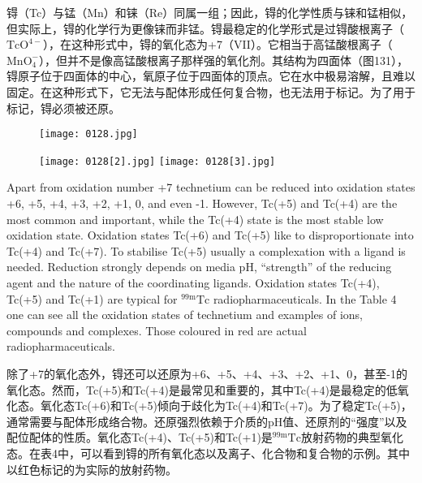 \documentclass[dvipsnames, svgnames,a4paper,11pt]{article}
\begin{document}
锝（Tc）与锰（Mn）和铼（Re）同属一组；因此，锝的化学性质与铼和锰相似，但实际上，锝的化学行为更像铼而非锰。锝最稳定的化学形式是过锝酸根离子（$\mathrm{TcO^{4-}}$），在这种形式中，锝的氧化态为+7（VII）。它相当于高锰酸根离子（$\mathrm{MnO_4^-}$），但并不是像高锰酸根离子那样强的氧化剂。其结构为四面体（图131），锝原子位于四面体的中心，氧原子位于四面体的顶点。它在水中极易溶解，且难以固定。在这种形式下，它无法与配体形成任何复合物，也无法用于标记。为了用于标记，锝必须被还原。

\begin{figure}[h]
	\centering
    \texttt{[image: 0128.jpg]}    
     \label{fig130}
\end{figure}

\begin{figure}[h]
	\centering
    \texttt{[image: 0128[2].jpg]}    
    \hspace{0.2in}
    \texttt{[image: 0128[3].jpg]} 
     \label{fig131}
\end{figure}

Apart from oxidation number +7 technetium can be reduced into oxidation states +6,
+5, +4, +3, +2, +1, 0, and even -1. However, Tc(+5) and Tc(+4) are the most
common and important, while the Tc(+4) state is the most stable low oxidation state.
Oxidation states Tc(+6) and Tc(+5) like to disproportionate into Tc(+4) and Tc(+7).
To stabilise Tc(+5) usually a complexation with a ligand is needed. Reduction
strongly depends on media pH, “strength” of the reducing agent and the nature of the
coordinating ligands. Oxidation states Tc(+4), Tc(+5) and Tc(+1) are typical for ${}^\mathrm{99m}\mathrm{Tc}$
radiopharmaceuticals. In the Table 4 one can see all the oxidation states of
technetium and examples of ions, compounds and complexes. Those coloured in red
are actual radiopharmaceuticals.

除了+7的氧化态外，锝还可以还原为+6、+5、+4、+3、+2、+1、0，甚至-1的氧化态。然而，Tc(+5)和Tc(+4)是最常见和重要的，其中Tc(+4)是最稳定的低氧化态。氧化态Tc(+6)和Tc(+5)倾向于歧化为Tc(+4)和Tc(+7)。为了稳定Tc(+5)，通常需要与配体形成络合物。还原强烈依赖于介质的pH值、还原剂的“强度”以及配位配体的性质。氧化态Tc(+4)、Tc(+5)和Tc(+1)是${}^\mathrm{99m}\mathrm{Tc}$放射药物的典型氧化态。在表4中，可以看到锝的所有氧化态以及离子、化合物和复合物的示例。其中以红色标记的为实际的放射药物。
\end{document}
